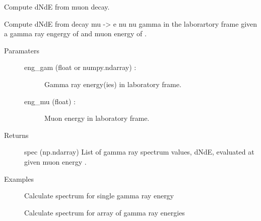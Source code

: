 \documentclass[letterpaper,10pt,english]{sphinxmanual}
\begin{document}
\begin{fulllineitems}
\label{\detokenize{modules:hazma.muon.decay_spectra}}
Compute dNdE from muon decay.

Compute dNdE from decay mu -\textgreater{} e nu nu gamma in the laborartory frame given
a gamma ray engergy of  and muon energy of .
\begin{description}
\item[{Paramaters}] \leavevmode\begin{description}
\item[{eng\_gam (float or numpy.ndarray) :}] \leavevmode
Gamma ray energy(ies) in laboratory frame.

\item[{eng\_mu (float) :}] \leavevmode
Muon energy in laboratory frame.

\end{description}

\item[{Returns}] \leavevmode
spec (np.ndarray) List of gamma ray spectrum values, dNdE, evaluated at
 given muon energy .

\item[{Examples}] \leavevmode
Calculate spectrum for single gamma ray energy

\begin{sphinxVerbatim}[commandchars=\\\{\}]
   
    
   
\end{sphinxVerbatim}

Calculate spectrum for array of gamma ray energies

\begin{sphinxVerbatim}[commandchars=\\\{\}]
   
   
     
  
   
\end{sphinxVerbatim}


\end{description}
\end{fulllineitems}
\end{document}
